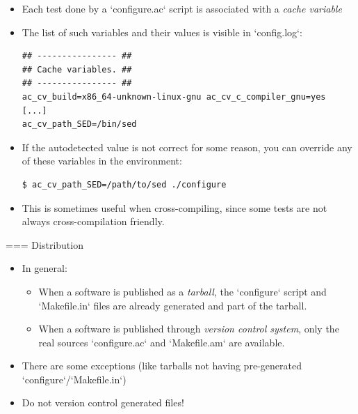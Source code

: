   \begin{itemize}

  \item Each test done by a `configure.ac` script is associated
    with a {\em cache variable}

  \item The list of such variables and their values is visible in
    `config.log`:
    \begin{block}{}
{\tiny
\begin{verbatim}
## ---------------- ##
## Cache variables. ##
## ---------------- ##
ac_cv_build=x86_64-unknown-linux-gnu ac_cv_c_compiler_gnu=yes
[...]
ac_cv_path_SED=/bin/sed
\end{verbatim}}
    \end{block}

  \item If the autodetected value is not correct for some reason, you
    can override any of these variables in the environment:
    \begin{block}{}
{\scriptsize
\begin{verbatim}
$ ac_cv_path_SED=/path/to/sed ./configure
\end{verbatim}}
    \end{block}

  \item This is sometimes useful when cross-compiling, since some
    tests are not always cross-compilation friendly.

  \end{itemize}



=== {Distribution}
  \begin{itemize}
  \item In general:
    \begin{itemize}
    \item When a software is published as a {\em tarball}, the
      `configure` script and `Makefile.in` files are already
      generated and part of the tarball.
    \item When a software is published through {\em version control
        system}, only the real sources `configure.ac` and
      `Makefile.am` are available.
    \end{itemize}
  \item There are some exceptions (like tarballs not having
    pre-generated `configure`/`Makefile.in`)
  \item Do not version control generated files!
  \end{itemize}


